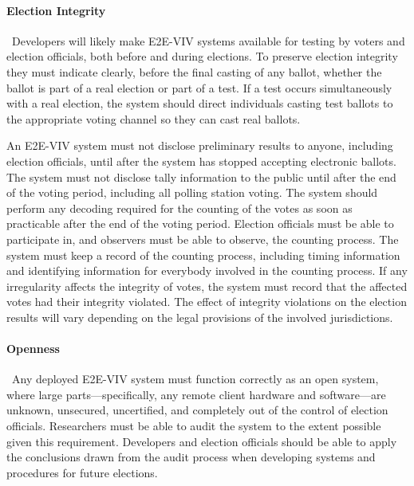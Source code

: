 \paragraph{Election Integrity} \ Developers will likely make E2E-VIV
systems available for testing by voters and election officials, both
before and during elections. To preserve election integrity they must
indicate clearly, before the final casting of any ballot, whether the
ballot is part of a real election or part of a test. If a test occurs
simultaneously with a real election, the system should direct
individuals casting test ballots to the appropriate voting channel so
they can cast real ballots.

An E2E-VIV system must not disclose preliminary results to anyone,
including election officials, until after the system has stopped
accepting electronic ballots. The system must not disclose tally
information to the public until after the end of the voting period,
including all polling station voting. The system should perform any
decoding required for the counting of the votes as soon as practicable
after the end of the voting period. Election officials must be able to
participate in, and observers must be able to observe, the counting
process. The system must keep a record of the counting process,
including timing information and identifying information for everybody
involved in the counting process. If any irregularity affects the
integrity of votes, the system must record that the affected votes had
their integrity violated. The effect of integrity violations on the
election results will vary depending on the legal provisions of the
involved jurisdictions.

\paragraph{Openness} \ Any deployed E2E-VIV system must function
correctly as an open system, where large parts---specifically, any
remote client hardware and software---are unknown, unsecured,
uncertified, and completely out of the control of election
officials. Researchers must be able to audit the system to the extent
possible given this requirement. Developers and election officials
should be able to apply the conclusions drawn from the audit process
when developing systems and procedures for future elections.


